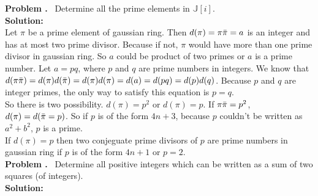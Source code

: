 \documentclass{article}
\newcounter{problem}
\newcounter{solution}
\newcommand\Problem{%
  \stepcounter{problem}%
  \textbf{Problem \theproblem.}~%
  \setcounter{solution}{0}%
}
\newcommand\TheSolution{%
  \textbf{\\Solution:}\\%
}
\begin{document}
\Problem{}
Determine all the prime elements in $\mathbb{J}[i]$.
\TheSolution{}
Let $\pi$ be a prime element of gaussian ring. Then $d(\pi)=\pi\Bar{\pi}=a$ is an integer and has at most two prime divisor. Because if not, $\pi$ would have more than one prime divisor in gaussian ring. So $a$ could be product of two primes or $a$ is a prime number. Let $a=pq$, where $p$ and $q$ are prime numbers in integers. We know that $d(\pi\Bar{\pi})=d(\pi)d(\Bar{\pi})=d(\pi)d(\pi)=d(a)=d(pq)=d(p)d(q)$. Because $p$ and $q$ are integer primes, the only way to satisfy this equation is $p=q$. \\
So there is two possibility. $d(\pi)=p^2$ or $d(\pi)=p$. If $\pi\Bar{\pi}=p^2$, $d(\pi)=d(\Bar{\pi}=p)$. So if $p$ is of the form $4n+3$, because $p$ couldn't be written as $a^2+b^2$, $p$ is a prime.\\
If $d(\pi)=p$ then two conjeguate prime divisors of $p$ are prime numbers in gaussian ring if $p$ is of the form $4n+1$ or $p=2$.\\

\Problem{}
Determine all positive integers which can be written as a sum of two squares (of integers).
\TheSolution{}
\\
\end{document}
